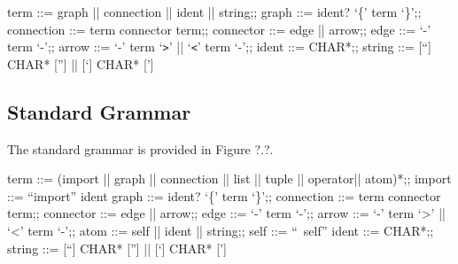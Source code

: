 \begin{bnfgrammar}
	term ::= graph || connection || ident || string;;
	graph ::= ident? `\{' term `\}';;
	connection ::= term connector term;;
	connector ::= edge || arrow;;
	edge ::= `-' term `-';;
	arrow ::= `-' term `\texttt{>}' || `\texttt{<}' term `-';;
	ident ::= CHAR*;;
	string ::= [``] CHAR* [''] || [`] CHAR* [']
\end{bnfgrammar}

\subsection{Standard Grammar}
The standard grammar is provided in Figure ?.?.
\begin{bnfgrammar}
	term ::= (import || graph || connection || list || tuple || operator|| atom)*;;
	import ::= ``import'' ident
	graph ::= ident? `\{' term `\}';;
	connection ::= term connector term;;
	connector ::= edge || arrow;;
	edge ::= `-' term `-';;
	arrow ::= `-' term `>' || `<' term `-';;
	atom ::= self || ident || string;;
	self ::= ``~self''
	ident ::= CHAR*;;
	string ::= [``] CHAR* [''] || [`] CHAR* [']
\end{bnfgrammar}

